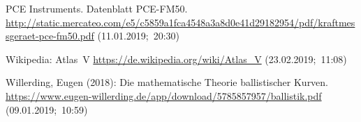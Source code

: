 \documentclass[10pt,a4paper]{article}
\begin{document}
\begin{thebibliography}{99}
	PCE Instruments. Datenblatt PCE-FM50. \\
	\url{http://static.mercateo.com/e5/c5859a1fca4548a3a8d0e41d29182954/pdf/kraftmessgeraet-pce-fm50.pdf} (11.01.2019;~20:30)
	
	Wikipedia: Atlas~V
	\url{https://de.wikipedia.org/wiki/Atlas_V} (23.02.2019;~11:08)
	
	Willerding, Eugen (2018): Die mathematische Theorie ballistischer Kurven.\\ \url{https://www.eugen-willerding.de/app/download/5785857957/ballistik.pdf} (09.01.2019;~10:59)
\end{thebibliography}
\end{document}
